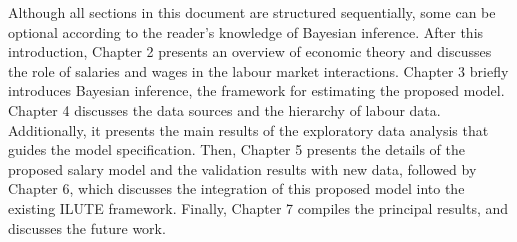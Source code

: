 Although all sections in this document are structured 
sequentially, some can be optional according to the reader's 
knowledge of Bayesian inference. After this introduction, 
Chapter 2 presents an overview of economic theory and discusses 
the role of salaries and wages in the labour market interactions. 
Chapter 3 briefly introduces Bayesian inference, the framework 
for estimating the proposed model. Chapter 4 discusses the data 
sources and the hierarchy of labour data. Additionally, it 
presents the main results of the exploratory data analysis that 
guides the model specification. Then, Chapter 5 presents the 
details of the proposed salary model and the validation results 
with new data, followed by Chapter 6, which discusses the 
integration of this proposed model into the existing ILUTE 
framework. Finally, Chapter 7 compiles the principal results, 
and discusses the future work.